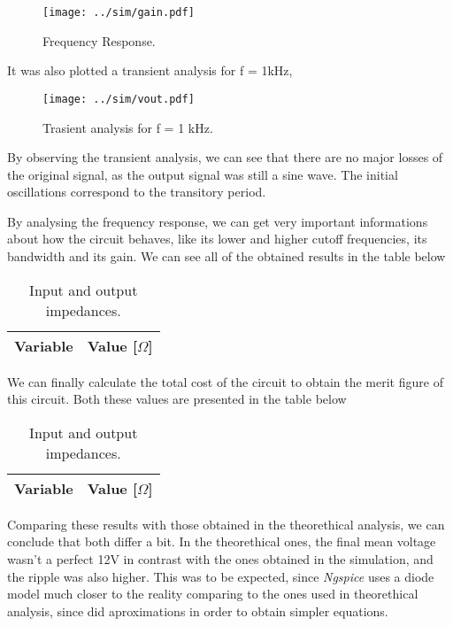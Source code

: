 \begin{figure}[H] \centering
\texttt{[image: ../sim/gain.pdf]}
\caption{Frequency Response.}
\label{fig:sim_deviation}
\end{figure}

It was also plotted a transient analysis for f = 1kHz, 

\begin{figure}[H] \centering
\texttt{[image: ../sim/vout.pdf]}
\caption{Trasient analysis for f = 1 kHz.}
\label{fig:sim_deviation}
\end{figure}

By observing the transient analysis, we can see that there are no major losses of the original signal, as the output signal was still a sine wave. The initial oscillations correspond to the transitory period.
\par
By analysing the frequency response, we can get very important informations about how the circuit behaves, like its lower and higher cutoff frequencies, its bandwidth and its gain. We can see all of the obtained results in the table below

\begin{table}[H]
  \centering
  \begin{tabular}{|l|r|}
    \hline    
    {\bf Variable} & {\bf Value [$\Omega$]} \\ \hline
    
  \end{tabular}
  \caption{Input and output impedances.}
  \label{tab:sim1}
\end{table}

We can finally calculate the total cost of the circuit to obtain the merit figure of this circuit. Both these values are presented in the table below

\begin{table}[H]
  \centering
  \begin{tabular}{|l|r|}
    \hline    
    {\bf Variable} & {\bf Value [$\Omega$]} \\ \hline
    
  \end{tabular}
  \caption{Input and output impedances.}
  \label{tab:sim1}
\end{table}

Comparing these results with those obtained in the theorethical analysis, we can conclude that both differ a bit. In the theorethical ones, the final mean voltage wasn't a perfect 12V in contrast with the ones obtained in the simulation, and the ripple was also higher. This was to be expected, since \textit{Ngspice} uses a diode model much closer to the reality comparing to the ones used in theorethical analysis, since did aproximations in order to obtain simpler equations.







